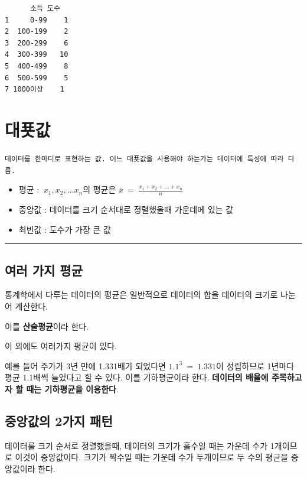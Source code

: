 \documentclass[
  letterpaper,
  DIV=11,
  numbers=noendperiod]{scrreprt}
\begin{document}
\begin{verbatim}
      소득 도수
1     0-99    1
2  100-199    2
3  200-299    6
4  300-399   10
5  400-499    8
6  500-599    5
7 1000이상    1
\end{verbatim}

\hypertarget{uxb300uxd46fuxac12}{%
\chapter{대푯값}\label{uxb300uxd46fuxac12}}

\texttt{데이터를\ 한마디로\ 표현하는\ 값.\ 어느\ 대푯값을\ 사용해야\ 하는가는\ 데이터에\ 특성에\ 따라\ 다름.}

\begin{itemize}
\item
  평균 : \(\ x_1, x_2, ...x_n\)의 평균은
  \(\bar{x}\ =\ \frac{x_1+x_2+ ...+x_n}{n}\)
\item
  중앙값 : 데이터를 크기 순서대로 정렬했을때 가운데에 있는 값
\item
  최빈값 : 도수가 가장 큰 값
\end{itemize}

\begin{center}\rule{0.5\linewidth}{0.5pt}\end{center}

\hypertarget{uxc5ecuxb7ec-uxac00uxc9c0-uxd3c9uxade0}{%
\section{여러 가지 평균}\label{uxc5ecuxb7ec-uxac00uxc9c0-uxd3c9uxade0}}

통계학에서 다루는 데이터의 평균은 일반적으로 데이터의 합을 데이터의
크기로 나눈어 계산한다.

이를 \textbf{산술평균}이라 한다.

이 외에도 여러가지 평균이 있다.

예를 들어 주가가 3년 만에 1.331배가 되었다면 \(1.1^3\ =\ 1.331\)이
성립하므로 1년마다 평균 1.1배씩 늘었다고 할 수 있다. 이를 기하평균이라
한다. \textbf{데이터의 배율에 주목하고자 할 때는 기하평균을 이용한다}.

\hypertarget{uxc911uxc559uxac12uxc758-2uxac00uxc9c0-uxd328uxd134}{%
\section{중앙값의 2가지
패턴}\label{uxc911uxc559uxac12uxc758-2uxac00uxc9c0-uxd328uxd134}}

데이터를 크기 순서로 정렬했을때, 데이터의 크기가 홀수일 때는 가운데 수가
1개이므로 이것이 중앙값이다. 크기가 짝수일 때는 가운데 수가 두개이므로
두 수의 평균을 중앙값이라 한다.
\end{document}
